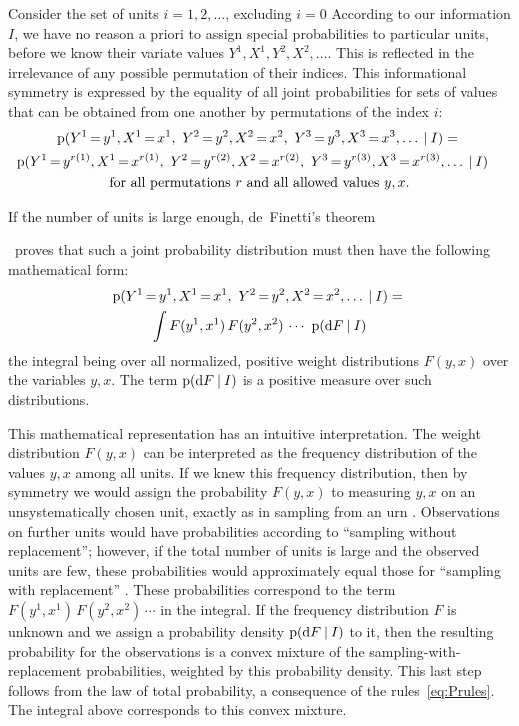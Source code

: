 \documentclass[\ifafour a4paper,12pt,\else a5paper,10pt,\fi%
onecolumn,oneside,article,%
british%
]{memoir}
\theoremstyle{remark}
\theoremstyle{innote}
\newcommand*{\ibid}{\unspace\addtocounter{footnote}{-1}\footnotemark{}}
\newcommand*{\di}{\mathrm{d}}%
\newcommand*{\p}{\mathrm{p}}%
\renewcommand*{\|}[1][]{\nonscript\:#1\vert\nonscript\:\mathopen{}}
\newcommand*{\mo}[1][=]{\mathord{\,#1\,}}
\newcommand*{\chap}{ch.}%
\begin{document}
\medskip

Consider the set of units $i=1,2,\dotsc$, excluding $i=0$
According to our information $I$, we have no reason a priori to assign special probabilities to particular units, before we know their variate values $Y^{1},X^{1},Y^{2},X^{2},\dotsc$. This is reflected in the irrelevance of any possible permutation of their indices. This informational symmetry is expressed by the equality of all joint probabilities for sets of values that can be obtained from one another by permutations of the index $i$:
\begin{multline}
  \label{eq:exchang12}
  \p(Y^{1}\mo y^{1},X^{1}\mo x^{1},\ 
  Y^{2}\mo y^{2},X^{2}\mo x^{2},\ 
  Y^{3}\mo y^{3},X^{3}\mo x^{3},\dotsc
  \|I) =
  {}\\
\shoveright{  \p(Y^{1}\mo y^{r(1)},X^{1}\mo x^{r(1)},\ 
  Y^{2}\mo y^{r(2)},X^{2}\mo x^{r(2)},\ 
  Y^{3}\mo y^{r(3)},X^{3}\mo x^{r(3)},\dotsc
  \|I)
}  \\
  \text{for all permutations $r$ and all allowed values $y,x$.}
\end{multline}

If the number of units is large enough, de~Finetti's theorem\ibid\ proves that such a joint probability distribution must then have the following mathematical form:
\begin{multline}
  \label{eq:deFinetti_integral}
  \p(Y^{1}\mo y^{1},X^{1}\mo x^{1},\ 
  Y^{2}\mo y^{2},X^{2}\mo x^{2},\dotsc
  \|I) =
  {}\\
  \int
  F(y^{1},x^{1})\, F(y^{2},x^{2})\,\dotsm
\ \p(\di F \|I)
\end{multline}
the integral being over all normalized, positive weight distributions $F(y,x)$ over the variables $y,x$. The term $\p(\di F \|I)$ is a positive measure over such distributions.

This mathematical representation has an intuitive interpretation. The weight distribution $F(y,x)$ can be interpreted as the frequency distribution of the values $y,x$ among all units. If we knew this frequency distribution, then by symmetry we would assign the probability $F(y,x)$ to measuring $y,x$ on an unsystematically chosen unit, exactly as in sampling from an urn \autocites[\chap~3]{jaynes1994_r2003}. Observations on further units would have probabilities according to \enquote{sampling without replacement}; however, if the total number of units is large and the observed units are few, these probabilities would approximately equal those for \enquote{sampling with replacement} \autocites{heathetal1976}[for error bounds see][]{diaconisetal1980}. These probabilities correspond to the term $F(y^{1},x^{1})\, F(y^{2},x^{2})\,\dotsm$ in the integral. If the frequency distribution $F$ is unknown and we assign a probability density $\p(\di F\|I)$ to it, then the resulting probability for the observations is a convex mixture of the sampling-with-replacement probabilities, weighted by this probability density. This last step follows from the law of total probability, a consequence of the rules~\eqref{eq:Prules}. The integral above corresponds to this convex mixture.
\end{document}
